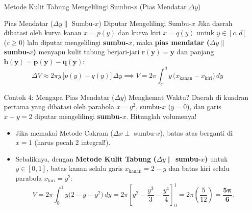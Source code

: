 \documentclass[aspectratio=43,10pt]{beamer}
\begin{document}
\begin{frame}{Metode Kulit Tabung Mengelilingi Sumbu-$x$ (Pias Mendatar $\Delta y$)}
    \begin{block}{Pias Mendatar ($\Delta y \parallel$ Sumbu-$x$) Diputar Mengelilingi Sumbu-$x$}
        \scriptsize\abovedisplayskip=2pt\belowdisplayskip=2pt
        Jika daerah dibatasi oleh kurva kanan $x = p(y)$ dan kurva kiri $x = q(y)$ untuk $y \in [c, d]$ ($c \ge 0$) lalu diputar mengelilingi \textbf{sumbu-$x$}, maka \textbf{pias mendatar ($\Delta y \parallel$ sumbu-$x$)} menyapu kulit tabung berjari-jari $\mathbf{r(y) = y}$ dan panjang $\mathbf{h(y) = p(y) - q(y)}$:
        $$\boxed{\;\Delta V \approx 2\pi y\,\big[p(y) - q(y)\big]\,\Delta y \implies V = 2\pi\int_{c}^{d} y\,\big(x_{\text{kanan}} - x_{\text{kiri}}\big)\,dy\;}$$
    \end{block}

    \begin{exampleblock}{Contoh 4: Mengapa Pias Mendatar ($\Delta y$) Menghemat Waktu?}
        \scriptsize\abovedisplayskip=2pt\belowdisplayskip=2pt
        Daerah di kuadran pertama yang dibatasi oleh parabola $x = y^2$, sumbu-$x$ ($y = 0$), dan garis $x + y = 2$ diputar mengelilingi \textbf{sumbu-$x$}. Hitunglah volumenya!
        \begin{itemize}\itemsep=1pt
            \item Jika memakai Metode Cakram ($\Delta x \perp$ sumbu-$x$), batas atas berganti di $x = 1$ (harus pecah 2 integral!).
            \item Sebaliknya, dengan \textbf{Metode Kulit Tabung ($\Delta y \parallel$ sumbu-$x$)} untuk $y \in [0, 1]$, batas kanan selalu garis $x_{\text{kanan}} = 2 - y$ dan batas kiri selalu parabola $x_{\text{kiri}} = y^2$:
            $$V = 2\pi\int_{0}^{1} y\big(2 - y - y^2\big)\,dy = 2\pi\left[y^2 - \frac{y^3}{3} - \frac{y^4}{4}\right]_{0}^{1} = 2\pi\left(\frac{5}{12}\right) = \mathbf{\frac{5\pi}{6}}.$$
        \end{itemize}
    \end{exampleblock}
\end{frame}
\end{document}
